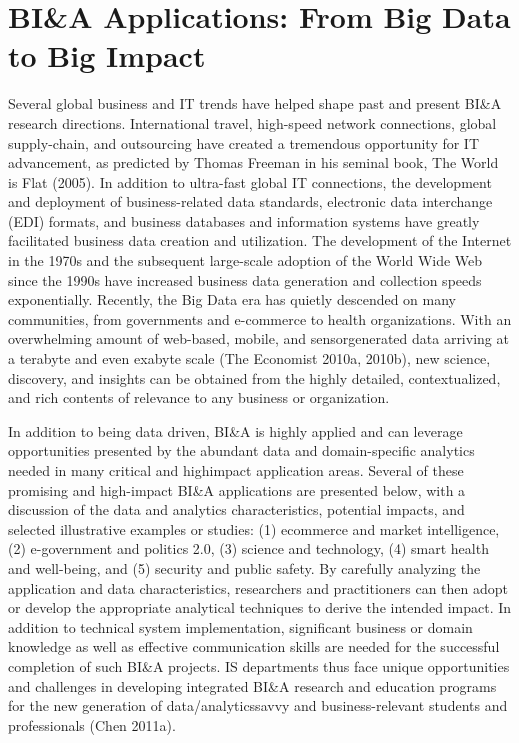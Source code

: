 \section{BI\&A Applications: From Big Data to Big Impact}

Several global business and IT trends have helped shape past
and present BI\&A research directions. International travel,
high-speed network connections, global supply-chain, and
outsourcing have created a tremendous opportunity for IT
advancement, as predicted by Thomas Freeman in his seminal
book, The World is Flat (2005). In addition to ultra-fast
global IT connections, the development and deployment of
business-related data standards, electronic data interchange
(EDI) formats, and business databases and information
systems have greatly facilitated business data creation and
utilization. The development of the Internet in the 1970s and
the subsequent large-scale adoption of the World Wide Web
since the 1990s have increased business data generation and
collection speeds exponentially. Recently, the Big Data era
has quietly descended on many communities, from governments
and e-commerce to health organizations. With an
overwhelming amount of web-based, mobile, and sensorgenerated
data arriving at a terabyte and even exabyte scale
(The Economist 2010a, 2010b), new science, discovery, and
insights can be obtained from the highly detailed, contextualized,
and rich contents of relevance to any business or
organization.

In addition to being data driven, BI\&A is highly applied and
can leverage opportunities presented by the abundant data and
domain-specific analytics needed in many critical and highimpact
application areas. Several of these promising and
high-impact BI\&A applications are presented below, with a
discussion of the data and analytics characteristics, potential
impacts, and selected illustrative examples or studies: (1) ecommerce
and market intelligence, (2) e-government and
politics 2.0, (3) science and technology, (4) smart health and
well-being, and (5) security and public safety. By carefully
analyzing the application and data characteristics, researchers
and practitioners can then adopt or develop the appropriate
analytical techniques to derive the intended impact. In addition
to technical system implementation, significant business
or domain knowledge as well as effective communication
skills are needed for the successful completion of such BI\&A
projects. IS departments thus face unique opportunities and
challenges in developing integrated BI\&A research and
education programs for the new generation of data/analyticssavvy
and business-relevant students and professionals (Chen
2011a).